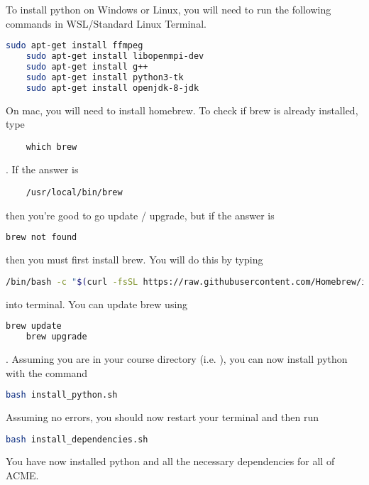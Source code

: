 To install python on Windows or Linux, you will need to run the following commands in WSL/Standard Linux Terminal.
\begin{lstlisting}[language=bash]
	sudo apt-get install ffmpeg
	sudo apt-get install libopenmpi-dev
	sudo apt-get install g++
	sudo apt-get install python3-tk
	sudo apt-get install openjdk-8-jdk
\end{lstlisting}
\ifwindows
\else
    On mac, you will need to install homebrew.
    To check if brew is already installed, type
    \begin{lstlisting}
    which brew
    \end{lstlisting}.
    If the answer is 
    \begin{lstlisting}
    /usr/local/bin/brew 
    \end{lstlisting}
    then you're good to go update / upgrade, but if the answer is
    \begin{lstlisting}[language=bash]
    brew not found
    \end{lstlisting}
    then you must first install brew.
    You will do this by typing
    \begin{lstlisting}[language=bash]
    /bin/bash -c "$(curl -fsSL https://raw.githubusercontent.com/Homebrew/install/HEAD/install.sh)"
    \end{lstlisting}
    into terminal.
    You can update brew using 
    \begin{lstlisting}[language=bash]
    brew update
    brew upgrade
    \end{lstlisting}.
\fi
Assuming you are in your course directory (i.e. ), you can now install python with the command
\begin{lstlisting}[language=bash]
    bash install_python.sh
\end{lstlisting}
Assuming no errors, you should now restart your terminal and then run
\begin{lstlisting}[language=bash]
    bash install_dependencies.sh
\end{lstlisting}
You have now installed python and all the necessary dependencies for all of ACME.

